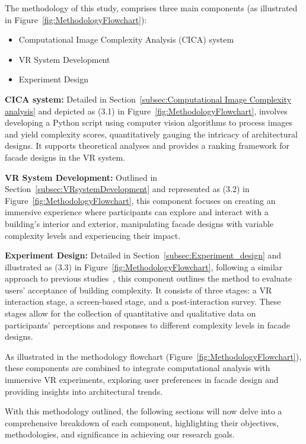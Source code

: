 The methodology of this study, comprises three main components (as illustrated in  Figure~\ref{fig:MethodologyFlowchart}):

\begin{itemize}
    \item Computational Image Complexity Analysis (CICA) system
    \item VR System Development
    \item Experiment Design
\end{itemize}

\textbf{CICA system:} Detailed in Section~\ref{subsec:Computational Image Complexity analysis} and depicted as (3.1) in Figure~\ref{fig:MethodologyFlowchart}, involves developing a Python script using computer vision algorithms to process images and yield complexity scores, quantitatively gauging the intricacy of architectural designs.
It supports theoretical analyses and provides a ranking framework for facade designs in the VR system.

\textbf{VR System Development:}  Outlined in Section~\ref{subsec:VRsystemDevelopment} and represented as (3.2) in Figure~\ref{fig:MethodologyFlowchart}, this component focuses on creating an immersive experience where participants can explore and interact with a building's interior and exterior, manipulating facade designs with variable complexity levels and experiencing their impact.

\textbf{Experiment Design:} Detailed in Section~\ref{subsec:Experiment_design} and illustrated as (3.3) in Figure~\ref{fig:MethodologyFlowchart}, following a similar approach to previous studies~\cite{Wolfartsberger2019}, this component outlines the method to evaluate users' acceptance of building complexity.
It consists of three stages: a VR interaction stage, a screen-based stage, and a post-interaction survey.
These stages allow for the collection of quantitative and qualitative data on participants' perceptions and responses to different complexity levels in facade designs.

As illustrated in the methodology flowchart (Figure~\ref{fig:MethodologyFlowchart}), these components are combined to integrate computational analysis with immersive VR experiments, exploring user preferences in facade design and providing insights into architectural trends.

With this methodology outlined, the following sections will now delve into a comprehensive breakdown of each component, highlighting their objectives, methodologies, and significance in achieving our research goals.


